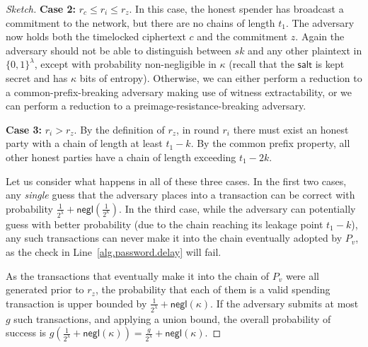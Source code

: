 \begin{proof}[Sketch]
  \textbf{Case 2:} $r_c \leq r_i \leq r_z$.
  In this case, the honest spender has broadcast a commitment to the network, but there
  are no chains of length $t_1$. The adversary now holds both the timelocked ciphertext $c$
  and the commitment $z$. Again the adversary should not be able to distinguish between $sk$
  and any other plaintext in $\{0, 1\}^\lambda$, except with probability non-negligible in
  $\kappa$ (recall that the $\textsf{salt}$ is kept secret and has $\kappa$ bits of entropy).
  Otherwise, we can either perform a reduction to a common-prefix-breaking adversary
  making use of witness extractability, or we can perform a reduction to a
  preimage-resistance-breaking adversary.

  \textbf{Case 3:} $r_i > r_z$.
  By the definition of $r_z$, in round $r_i$ there must exist an honest party
  with a chain of length at least $t_1 - k$. By the common prefix property, all
  other honest parties have a chain of length exceeding $t_1 - 2k$.

  Let us consider what happens in all of these three cases. In the first two cases, any
  \emph{single} guess that the adversary places into a transaction can be correct with
  probability $\frac{1}{2^\lambda} + \textsf{negl}(\frac{1}{2^\kappa})$. In the third
  case, while the adversary can potentially guess with better probability (due to the chain
  reaching its leakage point $t_1 - k$), any such transactions can never make it into
  the chain eventually adopted by $P_v$, as the check in Line~\ref{alg.password.delay}
  will fail.

  As the transactions that eventually make it into the chain of $P_v$ were all generated prior
  to $r_z$, the probability that each of them is a valid spending transaction is
  upper bounded by $\frac{1}{2^\lambda} + \textsf{negl}(\kappa)$.
  If the adversary submits at most $g$
  such transactions, and applying a union bound, the overall probability of success
  is $g(\frac{1}{2^\lambda} + \textsf{negl}(\kappa)) = \frac{g}{2^\lambda} + \textsf{negl}(\kappa)$.
\end{proof}

